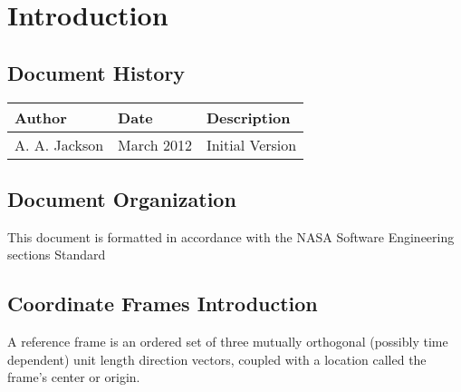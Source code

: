 \documentclass[twoside,11pt,titlepage]{report}
\newcommand\documentHistory{
{\bf Author} & {\bf Date} & {\bf Description} \\ \hline \hline
A. A. Jackson & March 2012 &  Initial Version \\ \hline
}
\begin{document}

\date{\RELEASEMONTH\ \RELEASEYEAR}
\modelname{\COORDFRAMEDesc}
\doctype{}
\author{\ModelAuthor}
\makeDynenvTitlepage


\setcounter{chapter}{0}
\tableofcontents
\vfill
\chapter{Introduction}\label{ch:intro}



\section{Document History}

\begin{tabular}{||l|l|l|} \hline
\documentHistory
\end{tabular}

\section{Document Organization}
This document is formatted in accordance with the 
NASA Software Engineering sections Standard~\cite{NASA:SWE} 

\section{Coordinate Frames Introduction}
 A reference frame is an ordered set of three
mutually orthogonal (possibly time dependent) unit length
direction vectors, coupled with a location
called the frame's center or origin.
 
\end{document}
